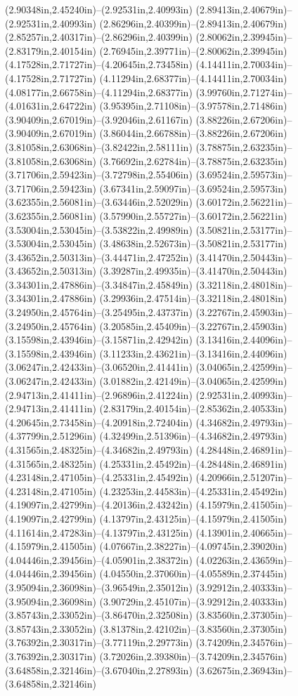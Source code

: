 (2.90348in,2.45240in)--(2.92531in,2.40993in) (2.89413in,2.40679in)--(2.92531in,2.40993in) (2.86296in,2.40399in)--(2.89413in,2.40679in) (2.85257in,2.40317in)--(2.86296in,2.40399in) (2.80062in,2.39945in)--(2.83179in,2.40154in) (2.76945in,2.39771in)--(2.80062in,2.39945in) (4.17528in,2.71727in)--(4.20645in,2.73458in) (4.14411in,2.70034in)--(4.17528in,2.71727in) (4.11294in,2.68377in)--(4.14411in,2.70034in) (4.08177in,2.66758in)--(4.11294in,2.68377in) (3.99760in,2.71274in)--(4.01631in,2.64722in) (3.95395in,2.71108in)--(3.97578in,2.71486in) (3.90409in,2.67019in)--(3.92046in,2.61167in) (3.88226in,2.67206in)--(3.90409in,2.67019in) (3.86044in,2.66788in)--(3.88226in,2.67206in) (3.81058in,2.63068in)--(3.82422in,2.58111in) (3.78875in,2.63235in)--(3.81058in,2.63068in) (3.76692in,2.62784in)--(3.78875in,2.63235in) (3.71706in,2.59423in)--(3.72798in,2.55406in) (3.69524in,2.59573in)--(3.71706in,2.59423in) (3.67341in,2.59097in)--(3.69524in,2.59573in) (3.62355in,2.56081in)--(3.63446in,2.52029in) (3.60172in,2.56221in)--(3.62355in,2.56081in) (3.57990in,2.55727in)--(3.60172in,2.56221in) (3.53004in,2.53045in)--(3.53822in,2.49989in) (3.50821in,2.53177in)--(3.53004in,2.53045in) (3.48638in,2.52673in)--(3.50821in,2.53177in) (3.43652in,2.50313in)--(3.44471in,2.47252in) (3.41470in,2.50443in)--(3.43652in,2.50313in) (3.39287in,2.49935in)--(3.41470in,2.50443in) (3.34301in,2.47886in)--(3.34847in,2.45849in) (3.32118in,2.48018in)--(3.34301in,2.47886in) (3.29936in,2.47514in)--(3.32118in,2.48018in) (3.24950in,2.45764in)--(3.25495in,2.43737in) (3.22767in,2.45903in)--(3.24950in,2.45764in) (3.20585in,2.45409in)--(3.22767in,2.45903in) (3.15598in,2.43946in)--(3.15871in,2.42942in) (3.13416in,2.44096in)--(3.15598in,2.43946in) (3.11233in,2.43621in)--(3.13416in,2.44096in) (3.06247in,2.42433in)--(3.06520in,2.41441in) (3.04065in,2.42599in)--(3.06247in,2.42433in) (3.01882in,2.42149in)--(3.04065in,2.42599in) (2.94713in,2.41411in)--(2.96896in,2.41224in) (2.92531in,2.40993in)--(2.94713in,2.41411in) (2.83179in,2.40154in)--(2.85362in,2.40533in) (4.20645in,2.73458in)--(4.20918in,2.72404in) (4.34682in,2.49793in)--(4.37799in,2.51296in) (4.32499in,2.51396in)--(4.34682in,2.49793in) (4.31565in,2.48325in)--(4.34682in,2.49793in) (4.28448in,2.46891in)--(4.31565in,2.48325in) (4.25331in,2.45492in)--(4.28448in,2.46891in) (4.23148in,2.47105in)--(4.25331in,2.45492in) (4.20966in,2.51207in)--(4.23148in,2.47105in) (4.23253in,2.44583in)--(4.25331in,2.45492in) (4.19097in,2.42799in)--(4.20136in,2.43242in) (4.15979in,2.41505in)--(4.19097in,2.42799in) (4.13797in,2.43125in)--(4.15979in,2.41505in) (4.11614in,2.47283in)--(4.13797in,2.43125in) (4.13901in,2.40665in)--(4.15979in,2.41505in) (4.07667in,2.38227in)--(4.09745in,2.39020in) (4.04446in,2.39456in)--(4.05901in,2.38372in) (4.02263in,2.43659in)--(4.04446in,2.39456in) (4.04550in,2.37060in)--(4.05589in,2.37445in) (3.95094in,2.36098in)--(3.96549in,2.35012in) (3.92912in,2.40333in)--(3.95094in,2.36098in) (3.90729in,2.45107in)--(3.92912in,2.40333in) (3.85743in,2.33052in)--(3.86470in,2.32508in) (3.83560in,2.37305in)--(3.85743in,2.33052in) (3.81378in,2.42102in)--(3.83560in,2.37305in) (3.76392in,2.30317in)--(3.77119in,2.29773in) (3.74209in,2.34576in)--(3.76392in,2.30317in) (3.72026in,2.39380in)--(3.74209in,2.34576in) (3.64858in,2.32146in)--(3.67040in,2.27893in) (3.62675in,2.36943in)--(3.64858in,2.32146in) 